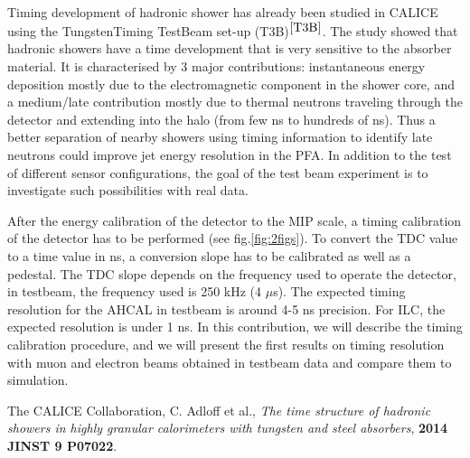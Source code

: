 Timing development of hadronic shower has already been studied in CALICE using the TungstenTiming TestBeam set-up (T3B)$^{\cite{T3B}}$. The study showed that hadronic showers have a time development that is very sensitive to the absorber material. It is characterised by 3 major contributions: instantaneous energy deposition mostly due to the electromagnetic component in the shower core, and a medium/late contribution mostly due to thermal neutrons traveling through the detector and extending into the halo (from few ns to hundreds of ns). Thus a better separation of nearby showers using timing information to identify late neutrons could improve jet energy resolution in the PFA. In addition to the test of different sensor configurations, the goal of the test beam experiment is to investigate such possibilities with real data.

After the energy calibration of the detector to the MIP scale, a timing calibration of the detector has to be performed (see fig.\ref{fig:2figs}). To convert the TDC value to a time value in ns, a conversion slope has to be calibrated as well as a pedestal. The TDC slope depends on the frequency used to operate the detector, in testbeam, the frequency used is 250 kHz (4 $\mu$s). The expected timing resolution for the AHCAL in testbeam is around 4-5 ns precision. For ILC, the expected resolution is under 1 ns.
In this contribution, we will describe the timing calibration procedure, and we will present the first results on timing resolution with muon and electron beams obtained in testbeam data and compare them to simulation.

\footnotesize
\begin{thebibliography}{1}

 The CALICE Collaboration, C. Adloff et al., {\em The time structure of hadronic showers in highly granular calorimeters with tungsten and
steel absorbers}, \textbf{2014 JINST 9 P07022}.

\end{thebibliography}


